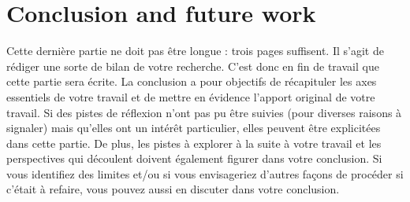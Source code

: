 \chapter{Conclusion and future work}
\label{chap:conclusion}

Cette dernière partie ne doit pas être longue : trois pages
suffisent. Il s'agit de rédiger une sorte de bilan de votre
recherche. C'est donc en fin de travail que cette partie sera
écrite. La conclusion a pour objectifs de récapituler les axes
essentiels de votre travail et de mettre en évidence l'apport original
de votre travail. Si des pistes de réflexion n'ont pas pu être suivies
(pour diverses raisons à signaler) mais qu'elles ont un intérêt
particulier, elles peuvent être explicitées dans cette partie. De
plus, les pistes à explorer à la suite à votre travail et les
perspectives qui découlent doivent également figurer dans votre
conclusion. Si vous identifiez des limites et/ou si vous envisageriez
d'autres façons de procéder si c'était à refaire, vous pouvez aussi en
discuter dans votre conclusion.